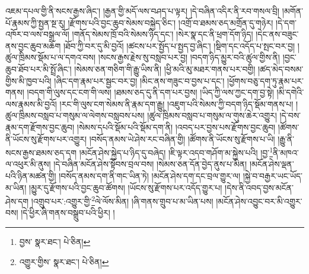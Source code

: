 འཇམ་དཔལ་གྱི་ནི་སངས་རྒྱས་ཞིང་། །རྒྱན་གྱི་མདོ་ལས་བཤད་པ་ལྟར། །དེ་བཞིན་འདིར་ནི་རབ་གསལ་བྲི། །མགོན་པོ་རྣམས་ཀྱི་སྤྱན་སྔ་རུ། །རྫོགས་པའི་བྱང་ཆུབ་སེམས་བསྐྱེད་ཅིང་། །འགྲོ་བ་ཐམས་ཅད་མགྲོན་དུ་གཉེར། །དེ་དག་འཁོར་བ་ལས་བསྒྲལ་ལོ། །གནོད་སེམས་ཁྲོ་བའི་སེམས་ཉིད་དང་། །སེར་སྣ་དང་ནི་ཕྲག་དོག་ཉིད། །དེང་ནས་བཟུང་ནས་བྱང་ཆུབ་མཆོག །ཐོབ་ཀྱི་བར་དུ་མི་བྱའོ། །ཚངས་པར་སྤྱོད་པ་སྤྱད་བྱ་ཞིང་། །སྡིག་དང་འདོད་པ་སྤང་བར་བྱ། །ཚུལ་ཁྲིམས་སྡོམ་པ་ལ་དགའ་བས། །སངས་རྒྱས་རྗེས་སུ་བསླབ་པར་བྱ། །བདག་ཉིད་མྱུར་བའི་ཚུལ་གྱིས་ནི། །བྱང་ཆུབ་ཐོབ་པར་མི་སྤྲོ་ཞིང་། །སེམས་ཅན་གཅིག་གི་རྒྱུ་ཡིས་ནི། །ཕྱི་མའི་མུ་མཐར་གནས་པར་བགྱི། །ཚད་མེད་བསམ་གྱིས་མི་ཁྱབ་པའི། །ཞིང་དག་རྣམ་པར་སྦྱང་བར་བྱ། །མིང་ནས་གཟུང་བ་བྱས་པ་དང་། །ཕྱོགས་བཅུ་དག་ཏུ་རྣམ་པར་གནས། །བདག་གི་ལུས་དང་ངག་གི་ལས། །ཐམས་ཅད་དུ་ནི་དག་པར་བྱས། །ཡིད་ཀྱི་ལས་ཀྱང་དག་བྱ་སྟེ། །མི་དགེའི་ལས་རྣམས་མི་བྱའོ། །རང་གི་ལུས་ངག་སེམས་ནི་རྣམ་དག་རྒྱུ། །འཇུག་པའི་སེམས་ཀྱི་བདག་ཉིད་སྡོམ་གནས་པ། །ཚུལ་ཁྲིམས་བསླབ་པ་གསུམ་ལ་ལེགས་བསླབས་པས། །ཚུལ་ཁྲིམས་བསླབ་པ་གསུམ་ལ་གུས་ཆེར་འགྱུར། །དེ་བས་རྣམ་དག་རྫོགས་བྱང་ཆུབ། །སེམས་དཔའི་སྡོམ་པའི་སྡོམ་དག་ནི། །འབད་པར་བྱས་པས་རྫོགས་བྱང་ཆུབ། །ཚོགས་ནི་ཡོངས་སུ་རྫོགས་པར་འགྱུར། །བསོད་ནམས་ཡེ་ཤེས་རང་བཞིན་གྱི། །ཚོགས་ནི་ཡོངས་སུ་རྫོགས་པ་ཡི། །རྒྱུ་ནི་སངས་རྒྱས་ཐམས་ཅད་དག །མངོན་ཤེས་སྐྱེད་པ་ཉིད་དུ་བཞེད། །ཇི་ལྟར་འདབ་གཤོག་མ་སྐྱེས་པའི། །བྱ་\footnote{བྱས་  སྣར་ཐང་།  པེ་ཅིན། }ནི་མཁའ་ལ་འཕུར་མི་ནུས། །དེ་བཞིན་མངོན་ཤེས་སྟོབས་བྲལ་བས། །སེམས་ཅན་དོན་བྱེད་ནུས་པ་མིན། །མངོན་ཤེས་ལྡན་པའི་ཉིན་མཚན་གྱི། །བསོད་ནམས་དག་ནི་གང་ཡིན་ཏེ། །མངོན་ཤེས་དག་དང་བྲལ་གྱུར་ལ། །སྐྱེ་བ་བརྒྱར་ཡང་ཡོད་མ་ཡིན། །མྱུར་དུ་རྫོགས་པའི་བྱང་ཆུབ་ཚོགས། །ཡོངས་སུ་རྫོགས་པར་འདོད་གྱུར་པ། །དེས་ནི་འབད་བྱས་མངོན་ཤེས་དག །འགྲུབ་པར་:འགྱུར་གྱི་\footnote{འགྱུར་གྱིས་  སྣར་ཐང་།  པེ་ཅིན། }ལེ་ལོས་མིན། །ཞི་གནས་གྲུབ་པ་མ་ཡིན་པས། །མངོན་ཤེས་འབྱུང་བར་མི་འགྱུར་བས། །དེ་ཕྱིར་ཞི་གནས་བསྒྲུབ་པའི་ཕྱིར། །
